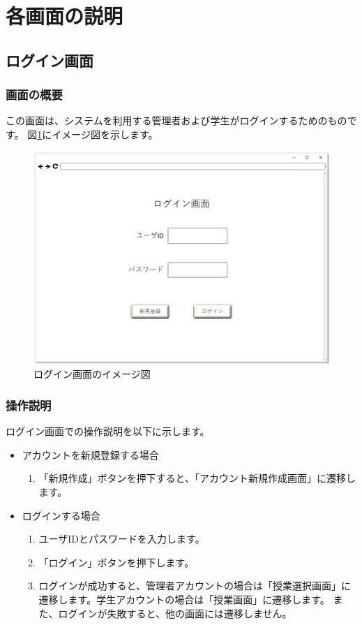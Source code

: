 \section{各画面の説明}
\subsection{ログイン画面}
\subsubsection{画面の概要}
この画面は、システムを利用する管理者および学生がログインするためのものです。
図\ref{fig:sc_login}にイメージ図を示します。

\begin{figure}[htbp]
  \begin{center}
    \includegraphics[width=1\linewidth,clip]{./img/sc_login.png}
    \caption{ログイン画面のイメージ図}\label{fig:sc_login}
  \end{center}
\end{figure}

\subsubsection{操作説明}
ログイン画面での操作説明を以下に示します。
\begin{itemize}
\item アカウントを新規登録する場合
\begin{enumerate}
\item 「新規作成」ボタンを押下すると、「アカウント新規作成画面」に遷移します。
\end{enumerate}
\item ログインする場合
\begin{enumerate}
\item ユーザIDとパスワードを入力します。
\item 「ログイン」ボタンを押下します。
\item ログインが成功すると、管理者アカウントの場合は「授業選択画面」に遷移します。学生アカウントの場合は「授業画面」に遷移します。
      また、ログインが失敗すると、他の画面には遷移しません。
\end{enumerate}
\end{itemize}

